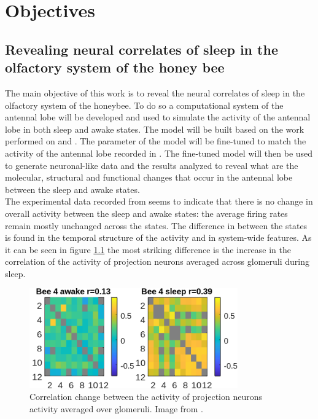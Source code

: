 \graphicspath{{chapters/03/images}}
\chapter{Objectives}

\section{Revealing neural correlates of sleep in the olfactory system of the honey bee}
The main objective of this work is to reveal the neural correlates of sleep in the olfactory system of the honeybee.
To do so a computational system of the antennal lobe will be developed and used to simulate the activity of the antennal lobe in both sleep and awake states.
The model will be built based on the work performed on \cite{bee-geosmin} and \cite{data-driven-antennal-lobe-model}.
The parameter of the model will be fine-tuned to match the activity of the antennal lobe recorded in \cite{sleep-correlates}.
The fine-tuned model will then be used to generate neuronal-like data and the results analyzed to reveal what are the molecular, structural and functional changes that occur in the antennal lobe between the sleep and awake states.\\
The experimental data recorded from \cite{sleep-correlates} seems to indicate that there is no change in overall activity between the sleep and awake states: the average firing rates remain mostly unchanged across the states.
The difference in between the states is found in the temporal structure of the activity and in system-wide features.
As it can be seen in figure \ref{fig:exp-change-correlation} the most striking difference is the increase in the correlation of the activity of projection neurons averaged across glomeruli during sleep.

\begin{figure}
  \centering
  \includegraphics[width=0.8\textwidth]{exp-change-correlation}
  \caption{Correlation change between the activity of projection neurons activity averaged over glomeruli. Image from \cite{sleep-correlates}.}
  \label{fig:exp-change-correlation}
\end{figure}

